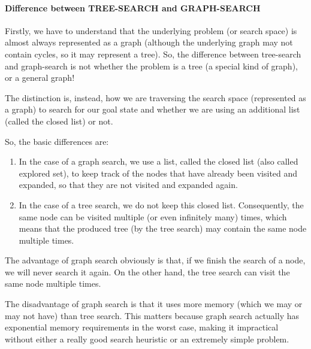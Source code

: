 \paragraph{Difference between TREE-SEARCH and GRAPH-SEARCH}

Firstly, we have to understand that the underlying problem (or search space) is almost always represented as a graph (although the underlying graph may not contain cycles, so it may represent a tree). So, the difference between tree-search and graph-search is not whether the problem is a tree (a special kind of graph), or a general graph!

The distinction is, instead, how we are traversing the search space (represented as a graph) to search for our goal state and whether we are using an additional list (called the closed list) or not.

So, the basic differences are:
\begin{enumerate}
  \item In the case of a graph search, we use a list, called the closed list (also called explored set), to keep track of the nodes that have already been visited and expanded, so that they are not visited and expanded again.

  \item In the case of a tree search, we do not keep this closed list. Consequently, the same node can be visited multiple (or even infinitely many) times, which means that the produced tree (by the tree search) may contain the same node multiple times.
\end{enumerate}


The advantage of graph search obviously is that, if we finish the search of a node, we will never search it again. On the other hand, the tree search can visit the same node multiple times.

The disadvantage of graph search is that it uses more memory (which we may or may not have) than tree search. This matters because graph search actually has exponential memory requirements in the worst case, making it impractical without either a really good search heuristic or an extremely simple problem.
